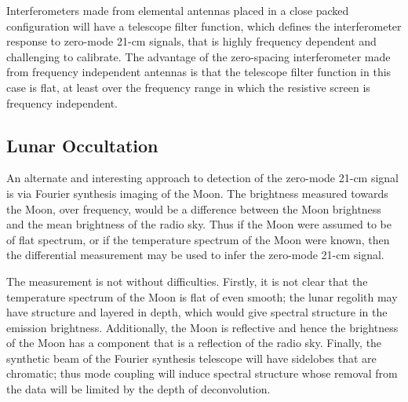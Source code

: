   Interferometers made from elemental antennas placed in a close packed configuration will have a telescope filter function, which defines the interferometer response to zero-mode 21-cm signals, that is highly frequency dependent and challenging to calibrate.  The advantage of the zero-spacing interferometer made from frequency independent antennas is that the telescope filter function in this case is flat, at least over the frequency range in which the resistive screen is frequency independent.  
  

\subsection{Lunar Occultation}
  
  An alternate and interesting approach to detection of the zero-mode 21-cm signal is via Fourier synthesis imaging of the Moon.  The brightness measured towards the Moon, over frequency, would be a difference between the Moon brightness and the mean brightness of the radio sky.  Thus if the Moon were assumed to be of flat spectrum, or if the temperature spectrum of the Moon were known, then the differential measurement may be used to infer the zero-mode 21-cm signal.
  
  The measurement is not without difficulties.  Firstly, it is not clear that the temperature spectrum of the Moon is flat of even smooth; the lunar regolith may have structure and layered in depth, which would give spectral structure in the emission brightness.  Additionally, the Moon is reflective and hence the brightness of the Moon has a component that is a reflection of the radio sky. Finally, the synthetic beam of the Fourier synthesis telescope will have sidelobes that are chromatic; thus mode coupling will induce spectral structure whose removal from the data will be limited by the depth of deconvolution. 
    








%




